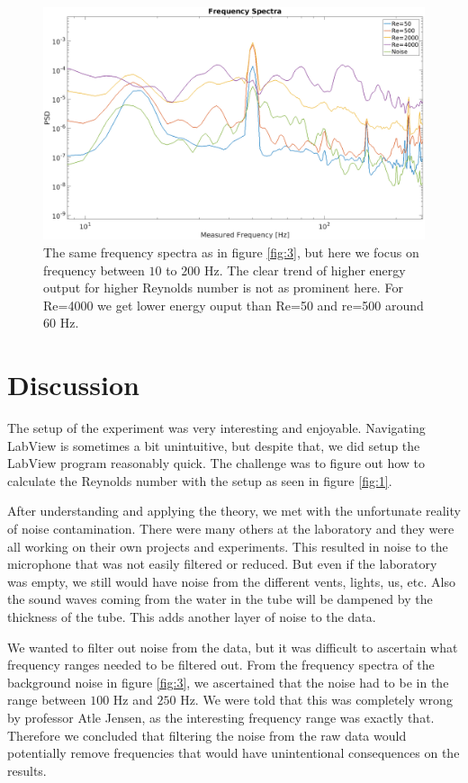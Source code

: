 \documentclass[english,a4paper,12pt]{article}
\begin{document}
\begin{figure}[H]
    \centering
    \includegraphics[width=170mm]{FrequencySpectraPlotZoomed.png}
    \caption{The same frequency spectra as in figure \ref{fig:3}, but here we focus on frequency between $10$ to $200$ Hz. The clear trend of higher energy output for higher Reynolds number is not as prominent here. For Re=4000 we get lower energy ouput than Re=50 and re=500 around $60$ Hz.}
    \label{fig:4}
\end{figure}

\section*{Discussion}
The setup of the experiment was very interesting and enjoyable. Navigating LabView is sometimes a bit unintuitive, but despite that, we did setup the LabView program reasonably quick. The challenge was to figure out how to calculate the Reynolds number with the setup as seen in figure \ref{fig:1}. \bigskip

After understanding and applying the theory, we met with the unfortunate reality of noise contamination. There were many others at the laboratory and they were all working on their own projects and experiments. This resulted in noise to the microphone that was not easily filtered or reduced. But even if the laboratory was empty, we still would have noise from the different vents, lights, us, etc. Also the sound waves coming from the water in the tube will be dampened by the thickness of the tube. This adds another layer of noise to the data. \bigskip

We wanted to filter out noise from the data, but it was difficult to ascertain what frequency ranges needed to be filtered out. From the frequency spectra of the background noise in figure \ref{fig:3}, we ascertained that the noise had to be in the range between $100$ Hz and $250$ Hz. We were told that this was completely wrong by professor Atle Jensen, as the interesting frequency range was exactly that. Therefore we concluded that filtering the noise from the raw data would potentially remove frequencies that would have unintentional consequences on the results. \bigskip
\end{document}
